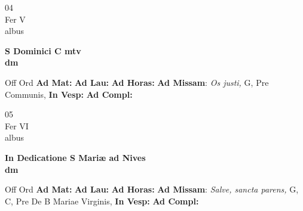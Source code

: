 \documentclass[10pt, openany]{book}
\begin{document}
        \begin{center}
            \begin{minipage}{3.5in}
                \vspace{2em}
                \begin{minipage}{0.5in}
                    {\Huge 04} \\
                    {\normalsize Fer V} \\
                    {\normalsize albus}
                \end{minipage}
                \begin{minipage}{3.0in}
                    \textbf{ \large S Dominici C mtv \\
                    \textnormal{\normalsize dm}} \\ 
                \end{minipage}
                \begin{justify}Off Ord
                    \textbf{Ad Mat: }
                    \textbf{Ad Lau: }
                    \textbf{Ad Horas: }\textbf{Ad Missam}: \textit{Os justi,} G, Pre Communis,  
                    \textbf{In Vesp: }
                    \textbf{Ad Compl: }
                \end{justify}
            \end{minipage}
        \end{center}
    
        \begin{center}
            \begin{minipage}{3.5in}
                \vspace{2em}
                \begin{minipage}{0.5in}
                    {\Huge 05} \\
                    {\normalsize Fer VI} \\
                    {\normalsize albus}
                \end{minipage}
                \begin{minipage}{3.0in}
                    \textbf{ \large In Dedicatione S Mariæ ad Nives \\
                    \textnormal{\normalsize dm}} \\ 
                \end{minipage}
                \begin{justify}Off Ord
                    \textbf{Ad Mat: }
                    \textbf{Ad Lau: }
                    \textbf{Ad Horas: }\textbf{Ad Missam}: \textit{Salve, sancta parens,} G, C, Pre De B Mariae Virginis,  
                    \textbf{In Vesp: }
                    \textbf{Ad Compl: }
                \end{justify}
            \end{minipage}
        \end{center}
    
\end{document}
